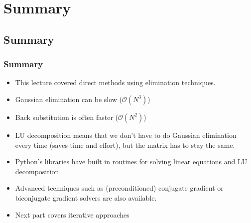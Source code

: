 \section{Summary}
\subsection*{Summary}

\begin{frame}[fragile]
  \frametitle{Summary}
  \begin{itemize}
    \item This lecture covered direct methods using elimination techniques.
    \item Gaussian elimination can be slow ($\mathcal{O}(N^3)$)
    \item Back substitution is often faster ($\mathcal{O}(N^2)$)
    \item LU decomposition means that we don't have to do Gaussian elimination every time (saves time and effort), but the matrix has to stay the same.
    \item Python's libraries have built in routines for solving linear equations and LU decomposition.
    \item Advanced techniques such as (preconditioned) conjugate gradient or biconjugate gradient solvers are also available.
    \item Next part covers iterative approaches
\end{itemize}
\end{frame}
